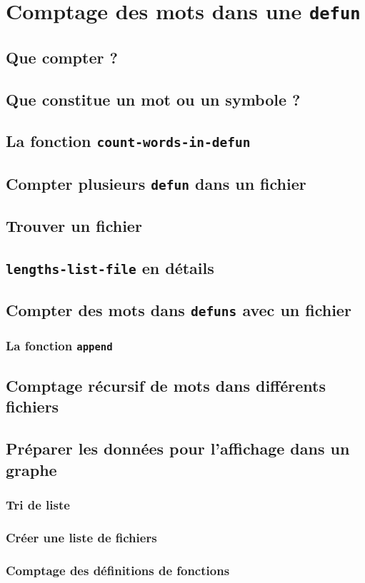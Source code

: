 \chapter{Comptage des mots dans une \texttt{defun}}

\section{Que compter ?}

\section{Que constitue un mot ou un symbole ?}

\section{La fonction \texttt{count-words-in-defun}}

\section{Compter plusieurs \texttt{defun} dans un
  fichier}

\section{Trouver un fichier}

\section{\texttt{lengths-list-file} en détails}

\section{Compter des mots dans \texttt{defuns} avec un
  fichier}

\subsection{La fonction \texttt{append}}

\section{Comptage récursif de mots dans différents
  fichiers}

\section{Préparer les données pour l'affichage dans un
  graphe}

\subsection{Tri de liste}

\subsection{Créer une liste de fichiers}

\subsection{Comptage des définitions de fonctions}


